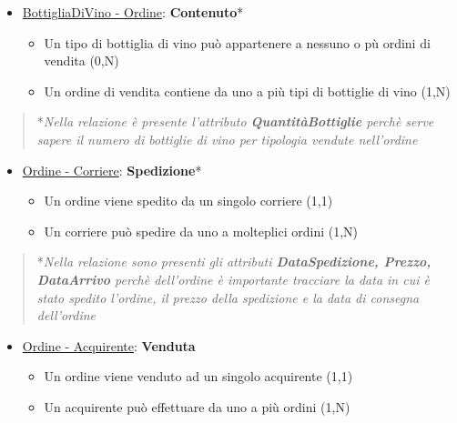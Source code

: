 \begin{itemize}
	\item \underline{BottigliaDiVino - Ordine}: \textbf{Contenuto}*
	
	\begin{itemize}
		\item Un tipo di bottiglia di vino può appartenere a nessuno o pù ordini di vendita (0,N)
		\item Un ordine di vendita contiene da uno a più tipi di bottiglie di vino (1,N)
	\end{itemize}
	
\end{itemize}

\begin{verse}
	*\emph{Nella relazione è presente l'attributo \textbf{QuantitàBottiglie} perchè serve sapere il numero di bottiglie di vino per tipologia vendute nell'ordine}
\end{verse}

\begin{itemize}
	\item \underline{Ordine - Corriere}: \textbf{Spedizione}*
	
	\begin{itemize}
		\item Un ordine viene spedito da un singolo corriere (1,1)
		\item Un corriere può spedire da uno a molteplici ordini (1,N)
	\end{itemize}
	
\end{itemize}

\begin{verse}
	*\emph{Nella relazione sono presenti gli attributi \textbf{DataSpedizione, Prezzo, DataArrivo} perchè dell'ordine è importante tracciare la data in cui è stato spedito l'ordine, il prezzo della spedizione e la data di consegna dell'ordine}
\end{verse}

\begin{itemize}
	\item \underline{Ordine - Acquirente}: \textbf{Venduta}
	
	\begin{itemize}
		\item Un ordine viene venduto ad un singolo acquirente (1,1)
		\item Un acquirente può effettuare da uno a più ordini (1,N)
	\end{itemize}
	
\end{itemize}

